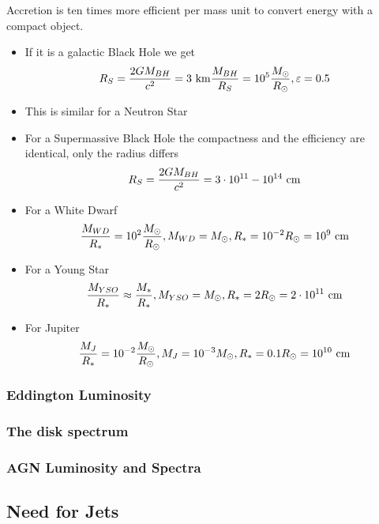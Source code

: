 \documentclass[10pt,a4paper,english]{article}
\begin{document}
Accretion is ten times more efficient per mass unit to convert energy with a compact object.
\begin{itemize}
  \item If it is a galactic Black Hole we get
  \begin{equation}
  R_{S} =\frac{2GM_{BH}}{c^{2}} = 3 \ \mathrm{km} \frac{M_{BH}}{R_{S}} = 10^{5}\frac{M_{\odot}}{R_{\odot}} , \varepsilon = 0.5
  \end{equation}
  \item This is similar for a Neutron Star
  \item For a Supermassive Black Hole the compactness and the efficiency are identical, only the radius differs
  \begin{equation}
  R_{S} =\frac{2GM_{BH}}{c^{2}} = 3\cdot 10^{11}-10^{14} \ \mathrm{cm}
  \end{equation}
  \item For a White Dwarf
  \begin{equation}
  \frac {M_{WD}}{R_{*}} =10^{2}\frac{M_{\odot}}{R_{\odot}} , M_{WD} = M_{\odot}, R_{*}=10^{-2}R_{\odot} = 10^{9} \ \mathrm{cm}
  \end{equation}
  \item For a Young Star
  \begin{equation}
  \frac {M_{YSO}}{R_{*}} \approx \frac{M_{*}}{R_{*}} , M_{YSO} = M_{\odot}, R_{*}=2R_{\odot} = 2\cdot 10^{11} \ \mathrm{cm}
  \end{equation}
  \item For Jupiter
  \begin{equation}
  \frac {M_{J}}{R_{*}} = 10^{-2}\frac{M_{\odot}}{R_{\odot}} , M_{J} = 10^{-3}M_{\odot}, R_{*}=0.1R_{\odot} = 10^{10}\ \mathrm{cm}
  \end{equation}
\end{itemize}

\subsubsection{Eddington Luminosity}
\subsubsection{The disk spectrum}
\subsubsection{AGN Luminosity and Spectra}

\subsection{Need for Jets}
\end{document}
